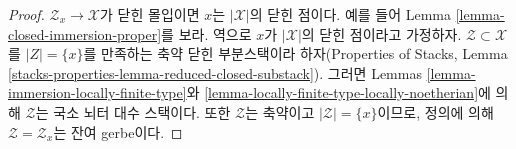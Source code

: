 \begin{proof}
$\mathcal{Z}_x \to \mathcal{X}$가 닫힌 몰입이면 $x$는
$|\mathcal{X}|$의 닫힌 점이다. 예를 들어 Lemma
\ref{lemma-closed-immersion-proper}를 보라. 역으로 $x$가
$|\mathcal{X}|$의 닫힌 점이라고 가정하자.
$\mathcal{Z} \subset \mathcal{X}$를 $|Z| = \{x\}$를 만족하는 축약 닫힌
부분스택이라 하자(Properties of Stacks, Lemma
\ref{stacks-properties-lemma-reduced-closed-substack}).
그러면 Lemmas \ref{lemma-immersion-locally-finite-type}와
\ref{lemma-locally-finite-type-locally-noetherian}에 의해 $\mathcal{Z}$는
국소 뇌터 대수 스택이다. 또한 $\mathcal{Z}$는 축약이고
$|\mathcal{Z}| = \{x\}$이므로, 정의에 의해
$\mathcal{Z} = \mathcal{Z}_x$는 잔여 gerbe이다.
\end{proof}

















